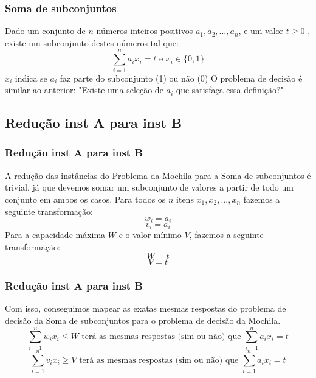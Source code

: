 \documentclass{beamer}
\begin{document}
\begin{frame}
    \frametitle{Soma de subconjuntos}
        Dado um conjunto de $n$ números inteiros positivos $a_{1}, a_{2}, ..., a_{n}$, e um valor $t \geq 0$ , existe um subconjunto destes números tal que:
         \begin{equation*}
            \sum_{i=1}^{n} a_{i} x_{i} = t \mbox{ e } x_{i} \in \{0,1\}
         \end{equation*}
        $x_{i}$ indica se $a_{i}$ faz parte do subconjunto (1) ou não (0)
        \newline
        \newline
        O problema de decisão é similar ao anterior: "Existe uma seleção de $a_{i}$ que satisfaça essa definição?"
\end{frame}

\subsection{Redução inst A para inst B}
\begin{frame}
    \frametitle{Redução inst A para inst B}
        A redução das instâncias do Problema da Mochila para a Soma de subconjuntos é trivial, já que devemos somar um subconjunto de valores a partir de todo um conjunto em ambos os casos.
        \newline
        \newline
        Para todos os $n$ itens $x_{1}, x_{2}, ..., x_{n}$ fazemos a seguinte transformação:
        \begin{equation*}
            w_{i} = a_{i}
        \end{equation*}
        \begin{equation*}
            v_{i} = a_{i}
        \end{equation*}
        Para a capacidade máxima $W$ e o valor mínimo $V$, fazemos a seguinte transformação:
        \begin{equation*}
            W = t
        \end{equation*}
        \begin{equation*}
            V = t
        \end{equation*}
        
\end{frame}

\begin{frame}
    \frametitle{Redução inst A para inst B}
        Com isso, conseguimos mapear as exatas mesmas respostas do problema de decisão da Soma de subconjuntos para o problema de decisão da Mochila.
         \begin{equation*}
            \sum_{i=1}^{n} w_{i} x_{i} \leq W \mbox{ terá as mesmas respostas (sim ou não) que } \sum_{i=1}^{n} a_{i} x_{i} = t
         \end{equation*}
         \begin{equation*}
            \sum_{i=1}^{n} v_{i} x_{i} \geq V \mbox{ terá as mesmas respostas (sim ou não) que } \sum_{i=1}^{n} a_{i} x_{i} = t
         \end{equation*}
\end{frame}
\end{document}
